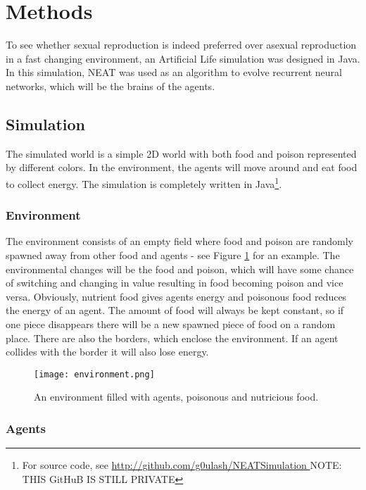\section{Methods}

To see whether sexual reproduction is indeed preferred over asexual reproduction in a fast changing environment, an Artificial Life simulation was designed in Java. In this simulation, NEAT was used as an algorithm to evolve recurrent neural networks, which will be the brains of the agents.

\subsection{Simulation}

The simulated world is a simple 2D world with both food and poison represented by different colors.
In the environment, the agents will move around and eat food to collect energy.
The simulation is completely written in Java\footnote{For source code, see \url{http://github.com/g0ulash/NEATSimulation } NOTE: THIS GitHuB IS STILL PRIVATE}.

\subsubsection{Environment}

The environment consists of an empty field where food and poison are randomly spawned away from other food and agents - see Figure \ref{fig:env} for an example.
The environmental changes will be the food and poison, which will have some chance of switching and changing in value resulting in food becoming poison and vice versa. 
Obviously, nutrient food gives agents energy and poisonous food reduces the energy of an agent.
The amount of food will always be kept constant, so if one piece disappears there will be a new spawned piece of food on a random place.
There are also the borders, which enclose the environment.
If an agent collides with the border it will also lose energy.

\begin{figure}[H]
\centering
\texttt{[image: environment.png]}
\caption{An environment filled with agents, poisonous and nutricious food.}
\label{fig:env}
\end{figure}

\subsubsection{Agents}

